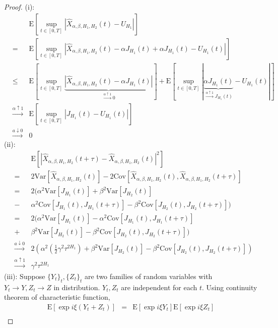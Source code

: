 \documentclass[a4paper, twoside, 11pt]{article}
\theoremstyle{definition}
\begin{document}
  \begin{proof}
(i): 
\begin{eqnarray*}
  &&\mathrm{E}[\sup\limits_{t\in[0,T]}|\hat{X}_{\alpha,\beta,H_1,H_2}(t) - U_{H_1}|]\\
  &=&\mathrm{E} [\sup\limits_{t\in[0,T]}|\hat{X}_{\alpha,\beta,H_1,H_2}(t) - \alpha J_{H_1}(t) + \alpha J_{H_1}(t) - U_{H_1}(t)|]\\
  &\le&\mathrm{E} [\sup\limits_{t\in[0,T]}\underbrace{|\hat{X}_{\alpha,\beta,H_1,H_2}(t) - \alpha J_{H_1}(t)|}_{\overset{\alpha\uparrow 1}{\rightarrow}0 }] + \mathrm{E} [\sup\limits_{t\in[0,T]}|\underbrace{\alpha J_{H_1}(t)}_{\overset{\alpha\uparrow 1}{\rightarrow} J_{H_1}(t)} - U_{H_1}(t)|]\\ 
  &\overset{\alpha\uparrow 1}{\rightarrow}&  \mathrm{E} [\sup\limits_{t\in[0,T]}|J_{H_1}(t) - U_{H_1}(t)|]\\
	&\overset{a\downarrow 0}{\rightarrow}& 0
\end{eqnarray*}
(ii):
\begin{eqnarray*}
  && \mathrm{E}[|\hat{X}_{\alpha, \beta, H_1, H_2}(t+\tau) - \hat{X}_{\alpha, \beta, H_1, H_2}(t)|^2]\\
  &=& 2\mathrm{Var}[\hat{X}_{\alpha, \beta, H_1, H_2}(t)] - 2\mathrm{Cov}[\hat{X}_{\alpha, \beta, H_1, H_2}(t), \hat{X}_{\alpha, \beta, H_1, H_2}(t+\tau)]\\
	&=& 2(\alpha^2\mathrm{Var}[J_{H_1}(t)] + \beta^2\mathrm{Var}[J_{H_2}(t)]  \\
	&-& \alpha^2\mathrm{Cov}[J_{H_1}(t), J_{H_1}(t+\tau)] - \beta^2\mathrm{Cov}[J_{H_2}(t), J_{H_2}(t+\tau)])\\
    &=&  2(\alpha^2\mathrm{Var}[J_{H_1}(t)] - \alpha^2\mathrm{Cov}[J_{H_1}(t), J_{H_1}(t+\tau)] \\
	&+& \beta^2\mathrm{Var}[J_{H_2}(t)] - \beta^2\mathrm{Cov}[J_{H_2}(t), J_{H_2}(t+\tau)])\\
	&\overset{a\downarrow 0}{\rightarrow}& 2 (\alpha^2(\frac{1}{2}\gamma^2 \tau^{2H_1}) + \beta^2\mathrm{Var}[J_{H_2}(t)] - \beta^2\mathrm{Cov}[J_{H_2}(t), J_{H_2}(t+\tau)])\\
	&\overset{\alpha\uparrow 1}{\rightarrow}& \gamma^2\tau^{2H_1}
\end{eqnarray*}
(iii): Suppose $\{Y_t\}_t, \{Z_t\}_t$ are two families of random variables with $Y_t \rightarrow Y, Z_t \rightarrow Z$ in distribution. $Y_t, Z_t$ are independent for each $t$. Using continuity theorem of characteristic function,
\begin{eqnarray*}
  \mathrm{E}[\exp{i\xi(Y_t+Z_t)}]&=& \mathrm{E}[\exp{i\xi Y_t}]\mathrm{E}[\exp{i\xi Z_t}]\\

\end{eqnarray*}
\end{proof}
\end{document}
